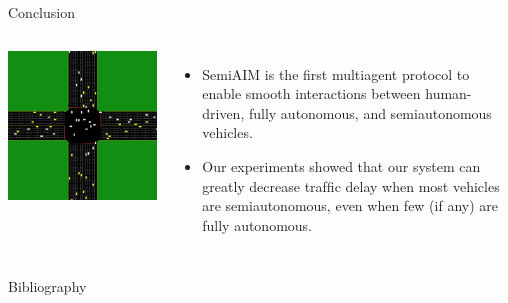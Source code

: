 \documentclass{beamer}
\begin{document}
\begin{frame}{Conclusion}
\begin{columns}[c]
	\includegraphics[width=\textwidth]{aim.png}
	\begin{itemize}
	\item SemiAIM is the first multiagent protocol to enable smooth
	interactions between human-driven, fully autonomous, and
	semiautonomous vehicles.\pause
	\item Our experiments showed that our system can greatly decrease
	trafﬁc delay when most vehicles are semiautonomous, even when few
	(if any) are fully autonomous.
	\end{itemize}
\end{columns}
\end{frame}

\begin{frame}{Bibliography}
\tiny{
}
\end{frame}
\end{document}
